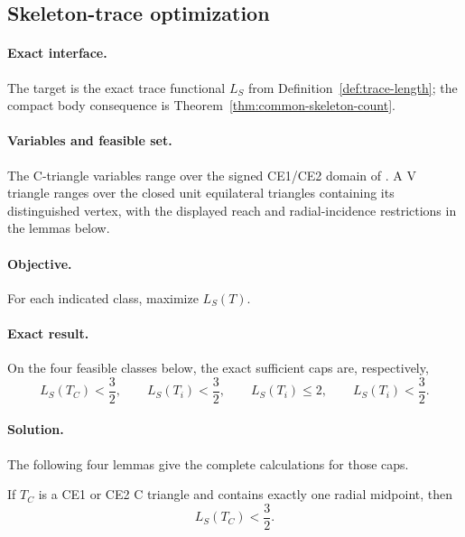\subsection{Skeleton-trace optimization}
\label{subsec:app-skeleton-trace-optimization}

\paragraph{Exact interface.}
The target is the exact trace functional $L_S$ from
Definition~\ref{def:trace-length}; the compact body consequence is
Theorem~\ref{thm:common-skeleton-count}.

\paragraph{Variables and feasible set.}
The C-triangle variables range over the signed CE1/CE2 domain of
.  A V triangle ranges over
the closed unit equilateral triangles containing its distinguished vertex,
with the displayed reach and radial-incidence restrictions in the lemmas
below.

\paragraph{Objective.}
For each indicated class, maximize $L_S(T)$.

\paragraph{Exact result.}
On the four feasible classes below, the exact sufficient caps are,
respectively,
\[
 L_S(T_C)<\frac32,\qquad
 L_S(T_i)<\frac32,\qquad
 L_S(T_i)\le2,\qquad
 L_S(T_i)<\frac32.
\]

\paragraph{Solution.}
The following four lemmas give the complete calculations for those caps.

\begin{lemma}
\label{lem:center-skeleton-cap}
If $T_C$ is a CE1 or CE2 C triangle and contains exactly one radial
midpoint, then
\[
 L_S(T_C)<\frac32.
\]
\end{lemma}

